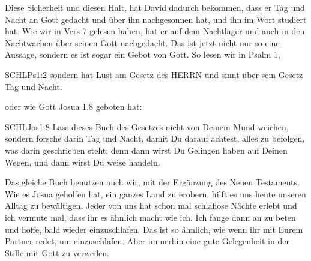 \documentclass[14pt]{mybib}
\begin{document}
    \begin{otsblock}
        Diese Sicherheit und diesen Halt, hat David dadurch bekommen, dass er Tag und Nacht an Gott gedacht und über ihn nachgesonnen hat, und ihn im Wort studiert hat. Wie wir in Vers 7 gelesen haben, hat er auf dem Nachtlager und auch in den Nachtwachen über seinen Gott nachgedacht. Das ist jetzt nicht nur so eine Aussage, sondern es ist sogar ein Gebot von Gott. So lesen wir in Psalm 1,
        \begin{bibelbox}{SCHL}{Ps}{1:2}
            sondern hat Lust am Gesetz des HERRN und sinnt über sein Gesetz Tag und Nacht.
        \end{bibelbox}
        oder wie Gott Josua 1.8 geboten hat:
        \begin{bibelbox}{SCHL}{Jos}{1:8}
            Lass dieses Buch des Gesetzes nicht von Deinem Mund weichen, sondern forsche darin Tag und Nacht, damit Du darauf achtest, alles zu befolgen, was darin geschrieben steht; denn dann wirst Du Gelingen haben auf Deinen Wegen, und dann wirst Du weise handeln.
        \end{bibelbox}
        Das gleiche Buch benutzen auch wir, mit der Ergänzung des Neuen Testaments. Wie es Josua geholfen hat, ein ganzes Land zu erobern, hilft es uns heute unseren Alltag zu bewältigen.
        Jeder von uns hat schon mal schlaflose Nächte erlebt und ich vermute mal, dass ihr es ähnlich macht wie ich. Ich fange dann an zu beten und hoffe, bald wieder einzuschlafen. Das ist so ähnlich, wie wenn ihr mit Eurem Partner redet, um einzuschlafen. Aber immerhin eine gute Gelegenheit in der Stille mit Gott zu verweilen.
    \end{otsblock}   
\end{document}
